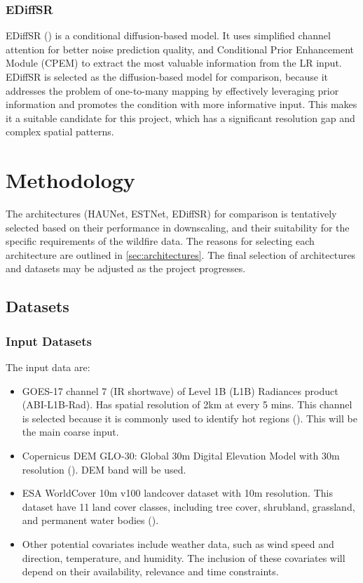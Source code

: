 \documentclass[a4paper, 11pt]{article}
\begin{document}
\subsubsection{EDiffSR}
EDiffSR (\cite{xiaoEDiffSREfficientDiffusion2023}) is a conditional diffusion-based model. It uses simplified channel attention for better noise prediction quality, and Conditional Prior Enhancement Module (CPEM) to extract the most valuable information from the LR input. EDiffSR is selected as the diffusion-based model for comparison, because it addresses the problem of one-to-many mapping by effectively leveraging prior information and promotes the condition with more informative input. This makes it a suitable candidate for this project, which has a significant resolution gap and complex spatial patterns.

\section{Methodology}
The architectures (HAUNet, ESTNet, EDiffSR) for comparison is tentatively selected based on their performance in downscaling, and their suitability for the specific requirements of the wildfire data. The reasons for selecting each architecture are outlined in \ref{sec:architectures}. The final selection of architectures and datasets may be adjusted as the project progresses.

\subsection{Datasets}
\subsubsection{Input Datasets}
The input data are:
\begin{itemize}
    \item GOES-17 channel 7 (IR shortwave) of Level 1B (L1B) Radiances product (ABI-L1B-Rad). Has spatial resolution of 2km at every 5 mins. This channel is selected because it is commonly used to identify hot regions (\cite{badhanDeepLearningApproach2024}). This will be the main coarse input.
    \item Copernicus DEM GLO-30: Global 30m Digital Elevation Model with 30m resolution (\cite{europeanspaceagencyCopernicus2022}). DEM band will be used.
    \item ESA WorldCover 10m v100 landcover dataset with 10m resolution. This dataset have 11 land cover classes, including tree cover, shrubland, grassland, and permanent water bodies (\cite{zanagaESAWorldCover102021}).
    \item Other potential covariates include weather data, such as wind speed and direction, temperature, and humidity. The inclusion of these covariates will depend on their availability, relevance and time constraints.
\end{itemize}
\end{document}

